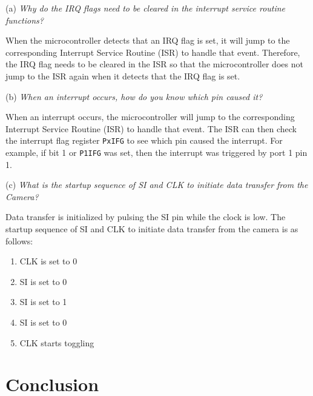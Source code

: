 \documentclass[CMPE]{KGCOEReport}
\begin{document}
(a) \emph{Why do the IRQ flags need to be cleared in the interrupt service routine functions?}

When the microcontroller detects that an IRQ flag is set, it will jump to the corresponding Interrupt Service Routine (ISR) to handle that event. Therefore, the IRQ flag needs to be cleared in the ISR so that the microcontroller does not jump to the ISR again when it detects that the IRQ flag is set.
\bigskip

(b) \emph{When an interrupt occurs, how do you know which pin caused it?}

When an interrupt occurs, the microcontroller will jump to the corresponding Interrupt Service Routine (ISR) to handle that event. The ISR can then check the interrupt flag register \verb|PxIFG| to see which pin caused the interrupt. For example, if bit 1 or \verb|P1IFG| was set, then the interrupt was triggered by port 1 pin 1.
\bigskip

(c) \emph{What is the startup sequence of SI and CLK to initiate data transfer from the Camera?}


Data transfer is initialized by pulsing the SI pin while the clock is low. The startup sequence of SI and CLK to initiate data transfer from the camera is as follows:

\begin{enumerate}
    \item CLK is set to 0
    \item SI is set to 0
    \item SI is set to 1
    \item SI is set to 0
    \item CLK starts toggling
\end{enumerate}

\section*{Conclusion}
\end{document}
